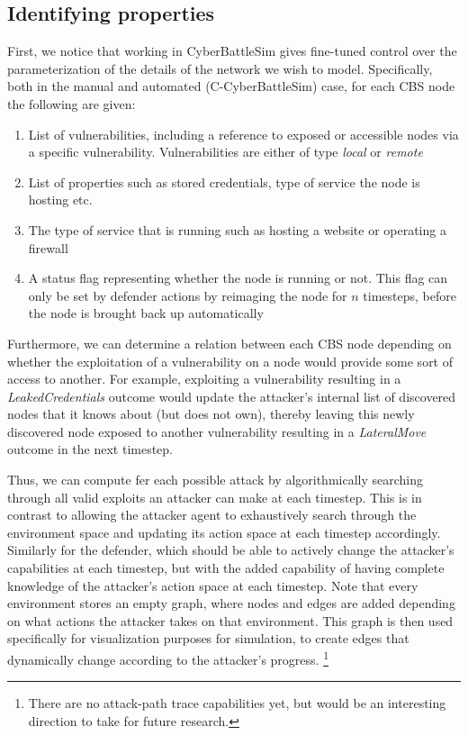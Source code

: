 \subsection{Identifying properties}
First, we notice that working in CyberBattleSim gives fine-tuned control over the parameterization of the details of the network we wish to model. Specifically, both in the manual and automated (C-CyberBattleSim) case, for each CBS node the following are given: \begin{enumerate}
    \item List of vulnerabilities, including a reference to exposed or accessible nodes via a specific vulnerability. Vulnerabilities are either of type \textit{local} or \textit{remote}
    \item List of properties such as stored credentials, type of service the node is hosting etc.
    \item The type of service that is running such as hosting a website or operating a firewall
    \item A status flag representing whether the node is running or not. This flag can only be set by defender actions by reimaging the node for $n$ timesteps, before the node is brought back up automatically
\end{enumerate}

Furthermore, we can determine a relation between each CBS node depending on whether the exploitation of a vulnerability on a node would provide some sort of access to another. For example, exploiting a vulnerability resulting in a \textit{LeakedCredentials} outcome would update the attacker's internal list of discovered nodes that it knows about (but does not own), thereby leaving this newly discovered node exposed to another vulnerability resulting in a \textit{LateralMove} outcome in the next timestep.

Thus, we can compute fer each possible attack by algorithmically searching through all valid exploits an attacker can make at each timestep. This is in contrast to allowing the attacker agent to exhaustively search through the environment space and updating its action space at each timestep accordingly. Similarly for the defender, which should be able to actively change the attacker's capabilities at each timestep, but with the added capability of having complete knowledge of the attacker's action space at each timestep. Note that every environment stores an empty graph, where nodes and edges are added depending on what actions the attacker takes on that environment. This graph is then used specifically for visualization purposes for simulation, to create edges that dynamically change according to the attacker's progress. \footnote{There are no attack-path trace capabilities yet, but would be an interesting direction to take for future research.}

